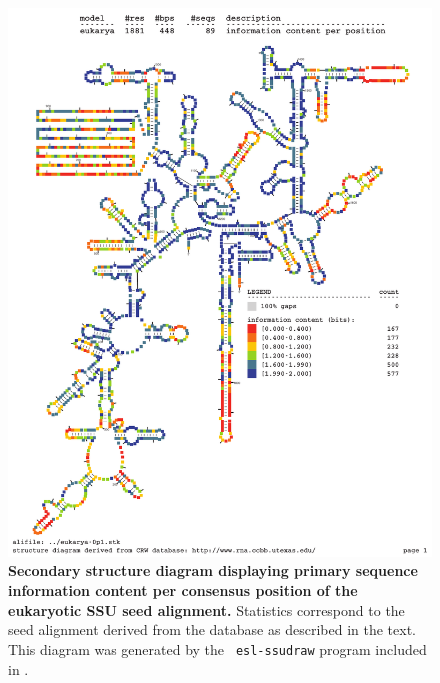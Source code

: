 \begin{figure}
\begin{center}
\includegraphics[width=5.5in]{../../seeds/ss-diagrams/eukarya-0p1-info}
\end{center}
\caption[Secondary structure diagram displaying primary sequence
  information content per consensus position of the eukaryotic SSU seed
  alignment]{\textbf{Secondary structure diagram displaying primary
  sequence information content per consensus position of the eukaryotic SSU seed
  alignment.} Statistics correspond to the  seed
  alignment derived from the  database \cite{CannoneGutell02}
  as described in the text. This diagram was generated by the {\tt
  esl-ssudraw} program included in .}
\label{fig:eukinfo}
\end{figure}


